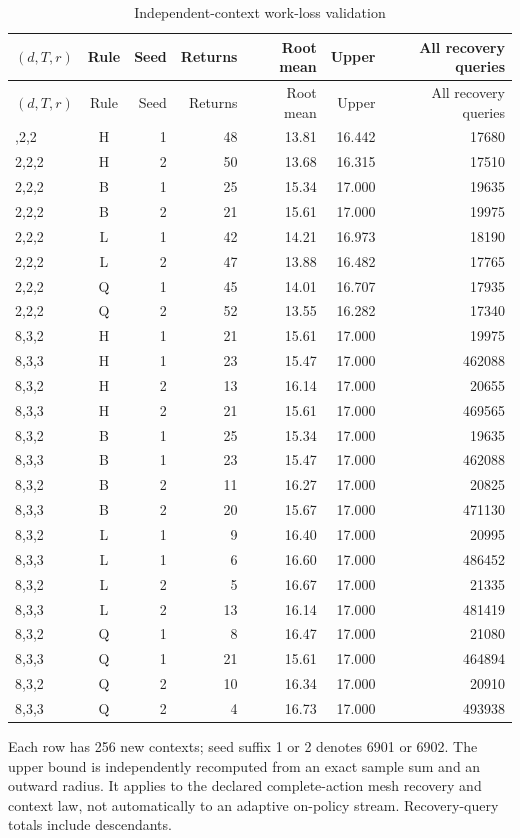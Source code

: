 \begingroup\small\setlength{\tabcolsep}{3pt}
\begin{longtable}{lcrrrrr}
\caption{Independent-context work-loss validation}\label{tab:validation70}\\
\hline
$(d,T,r)$ & Rule & Seed & Returns & Root mean & Upper & All recovery queries \\
\hline\endfirsthead
\hline
$(d,T,r)$ & Rule & Seed & Returns & Root mean & Upper & All recovery queries \\
\hline\endhead
\hline\endfoot
\hline\endlastfoot
2,2,2 & H & 1 & 48 & 13.81 & 16.442 & 17680 \\
2,2,2 & H & 2 & 50 & 13.68 & 16.315 & 17510 \\
2,2,2 & B & 1 & 25 & 15.34 & 17.000 & 19635 \\
2,2,2 & B & 2 & 21 & 15.61 & 17.000 & 19975 \\
2,2,2 & L & 1 & 42 & 14.21 & 16.973 & 18190 \\
2,2,2 & L & 2 & 47 & 13.88 & 16.482 & 17765 \\
2,2,2 & Q & 1 & 45 & 14.01 & 16.707 & 17935 \\
2,2,2 & Q & 2 & 52 & 13.55 & 16.282 & 17340 \\
8,3,2 & H & 1 & 21 & 15.61 & 17.000 & 19975 \\
8,3,3 & H & 1 & 23 & 15.47 & 17.000 & 462088 \\
8,3,2 & H & 2 & 13 & 16.14 & 17.000 & 20655 \\
8,3,3 & H & 2 & 21 & 15.61 & 17.000 & 469565 \\
8,3,2 & B & 1 & 25 & 15.34 & 17.000 & 19635 \\
8,3,3 & B & 1 & 23 & 15.47 & 17.000 & 462088 \\
8,3,2 & B & 2 & 11 & 16.27 & 17.000 & 20825 \\
8,3,3 & B & 2 & 20 & 15.67 & 17.000 & 471130 \\
8,3,2 & L & 1 & 9 & 16.40 & 17.000 & 20995 \\
8,3,3 & L & 1 & 6 & 16.60 & 17.000 & 486452 \\
8,3,2 & L & 2 & 5 & 16.67 & 17.000 & 21335 \\
8,3,3 & L & 2 & 13 & 16.14 & 17.000 & 481419 \\
8,3,2 & Q & 1 & 8 & 16.47 & 17.000 & 21080 \\
8,3,3 & Q & 1 & 21 & 15.61 & 17.000 & 464894 \\
8,3,2 & Q & 2 & 10 & 16.34 & 17.000 & 20910 \\
8,3,3 & Q & 2 & 4 & 16.73 & 17.000 & 493938 \\
\end{longtable}\endgroup
{\footnotesize Each row has 256 new contexts; seed suffix 1 or 2 denotes 6901 or 6902. The upper bound is independently recomputed from an exact sample sum and an outward radius. It applies to the declared complete-action mesh recovery and context law, not automatically to an adaptive on-policy stream. Recovery-query totals include descendants.}\par
